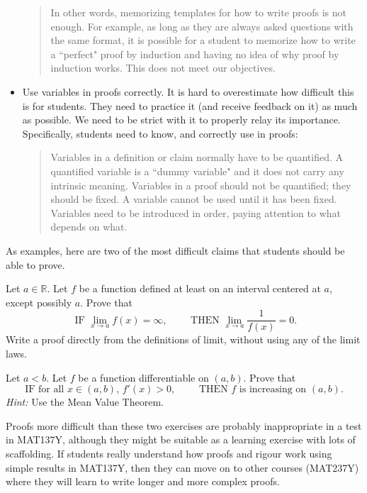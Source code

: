 \documentclass[11pt]{article}
\newcommand{\R}{\mathbb{R}}
\begin{document}
\begin{itemize}
		 \begin{quote}
		 In other words, memorizing templates for how to write proofs is not enough.  For example, as long as they are always asked questions with the same format, it is possible for a student to memorize how to write a ``perfect" proof by induction and having no idea of why proof by induction works.  This does not meet our objectives.	
		\end{quote}

		\item Use variables in proofs correctly.  It is hard to overestimate how difficult this is for students.  They need to practice it (and receive feedback on it) as much as possible.  We need to be strict with it to properly relay its importance.  Specifically, students need to know, and correctly use in proofs:  
			\begin{quote}
				Variables in a definition or claim normally have to be quantified. A quantified variable is a ``dummy variable" and it does not carry any intrinsic meaning.  Variables in a proof should not be quantified; they should be fixed.   A variable cannot be used until it has been fixed.  Variables need to be introduced in order, paying attention to what depends on what.  			
			\end{quote}
	\end{itemize}

As examples, here are two of the most difficult claims that students should be able to prove.   

	\begin{exercise}{}
			Let $a \in \R$.  Let $f$ be a function defined at least on an interval centered at $a$, except possibly $a$.  Prove that 
			$$ \mbox{ IF } \lim_{x \to a} f(x) = \infty, \quad \quad  \mbox{ THEN } \lim_{x \to a} \frac{1}{f(x)} = 0. $$
			Write a proof directly from the definitions of limit, without using any of the limit laws.
	\end{exercise}
	
	\begin{exercise}{}
	Let $a <b.$  Let $f$ be a function differentiable on $(a,b)$.  Prove that 
			$$
				\mbox{IF for all } x \in (a,b), \, f'(x)>0, \quad \quad \mbox{ THEN } f \mbox{ is increasing on } (a,b).
			$$
			\emph{Hint:} Use the Mean Value Theorem.
	\end{exercise}

Proofs more difficult than these two exercises are probably inappropriate in a test in MAT137Y, although they might be suitable as a learning exercise with lots of scaffolding.  If students really understand how proofs and rigour work using simple results in MAT137Y, then they can move on to other courses (MAT237Y) where they will learn to write longer and more complex proofs.
\end{document}
